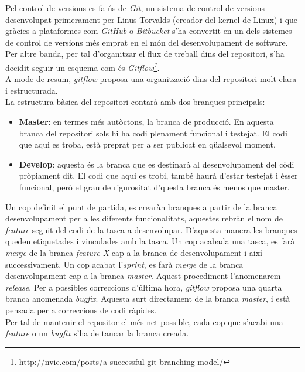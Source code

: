 Pel control de versions es fa ús de \textit{Git}, un sistema de control de versions desenvolupat primerament per Linus Torvalds (creador del kernel de Linux) i que gràcies a plataformes com \textit{GitHub} o \textit{Bitbucket} s'ha convertit en un dels sistemes de control de versions més emprat en el món del desenvolupament de software.\\
\newline Per altre banda, per tal d'organitzar el flux de treball dins del repositori, s'ha decidit seguir un esquema com és \textit{Gitflow\footnote{http://nvie.com/posts/a-successful-git-branching-model/}}.\\
A mode de resum, \textit{gitflow} proposa una organització dins del repositori molt clara i estructurada. \\
\newline La estructura bàsica del repositori contarà amb dos branques principals:
\begin{itemize}
	\item \textbf{Master}: en termes més autòctons, la branca de producció. En aquesta branca del repositori sols hi ha codi plenament funcional i testejat. El codi que aqui es troba, està preprat per a ser publicat en qüalsevol moment.
	\item \textbf{Develop}: aquesta és la branca que es destinarà al desenvolupament del còdi pròpiament dit. El codi que aqui es trobi, també haurà d'estar testejat i ésser funcional, però el grau de rigurositat d'questa branca és menos que master.
\end{itemize}
Un cop definit el punt de partida, es crearàn branques a partir de la branca desenvolupament per a les diferents funcionalitats, aquestes rebràn el nom de \textit{feature} seguit del codi de la tasca a desenvolupar. D'aquesta manera les branques queden etiquetades i vinculades amb la tasca.
\newline Un cop acabada una tasca, es farà \textit{merge} de la branca \textit{feature-X} cap a la branca de desenvolupament i així successivament.
\newline Un cop acabat l'\textit{sprint}, es farà \textit{merge} de la branca desenvolupament cap a la branca \textit{master}. Aquest procediment l'anomenarem \textit{release}.
\newline Per a possibles correccions d'última hora, \textit{gitflow} proposa una quarta branca anomenada \textit{bugfix}. Aquesta surt directament de la branca \textit{master}, i està pensada per a correccions de codi ràpides.\\
Per tal de mantenir el repositor el més net possible, cada cop que s'acabi una \textit{feature} o un \textit{bugfix} s'ha de tancar la branca creada.

